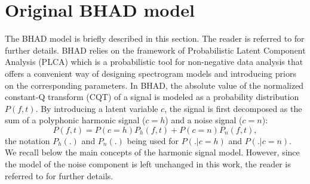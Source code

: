 \documentclass{article}
\begin{document}
\vspace{0.3cm}

\section{Original BHAD model}
\label{sec:Bhad}
The BHAD model is briefly described in this section. The reader is referred to \cite{Fuentes2012_EUSIPCO} for further details. BHAD relies on the framework of Probabilistic Latent Component Analysis (PLCA) which is a probabilistic tool for non-negative data analysis that offers a convenient way of designing spectrogram models and introducing priors on the corresponding parameters.
In BHAD, the absolute value of the normalized constant-Q transform (CQT) of a signal is modeled as a probability distribution $P(f,t)$. By introducing a latent variable $c$, the signal is first decomposed as the sum of a polyphonic harmonic signal ($c=h$) and a noise signal ($c=n$):
\begin{equation}
P(f,t) = P(c=h)P_h(f,t)+P(c=n)P_n(f,t),
\end{equation}
the notation $P_h(.)$ and $P_n(.)$ being used for $P(.|c=h)$ and $P(.|c=n)$.  We recall below the main concepts of the harmonic signal model. However, since the model of the noise component is left unchanged in this work, the reader is referred to \cite{Fuentes2012_EUSIPCO} for further details.


\end{document}
